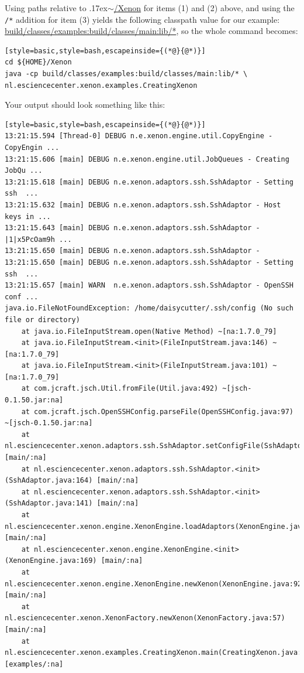\documentclass[12pt, a4paper, twoside,openany,titlepage]{article}
\newcommand{\mytilde}{\raise.17ex\hbox{$\scriptstyle\sim$}}
\begin{document}
{Using paths relative to \mytilde\url{/Xenon} for items (1) and (2) above, and using the \texttt{/*} addition for item (3) yields the following classpath value for our example: \url{build/classes/examples:build/classes/main:lib/*}, so the whole command becomes:
\begin{lstlisting}[style=basic,style=bash,escapeinside={(*@}{@*)}]
cd ${HOME}/Xenon
java -cp build/classes/examples:build/classes/main:lib/* \
nl.esciencecenter.xenon.examples.CreatingXenon
\end{lstlisting} %



Your output should look something like this:
\begin{lstlisting}[style=basic,style=bash,escapeinside={(*@}{@*)}]
13:21:15.594 [Thread-0] DEBUG n.e.xenon.engine.util.CopyEngine - CopyEngin ...
13:21:15.606 [main] DEBUG n.e.xenon.engine.util.JobQueues - Creating JobQu ...
13:21:15.618 [main] DEBUG n.e.xenon.adaptors.ssh.SshAdaptor - Setting ssh  ...
13:21:15.632 [main] DEBUG n.e.xenon.adaptors.ssh.SshAdaptor - Host keys in ...
13:21:15.643 [main] DEBUG n.e.xenon.adaptors.ssh.SshAdaptor - |1|x5PcOam9h ...
13:21:15.650 [main] DEBUG n.e.xenon.adaptors.ssh.SshAdaptor -
13:21:15.650 [main] DEBUG n.e.xenon.adaptors.ssh.SshAdaptor - Setting ssh  ...
13:21:15.657 [main] WARN  n.e.xenon.adaptors.ssh.SshAdaptor - OpenSSH conf ...
java.io.FileNotFoundException: /home/daisycutter/.ssh/config (No such file or directory)
    at java.io.FileInputStream.open(Native Method) ~[na:1.7.0_79]
    at java.io.FileInputStream.<init>(FileInputStream.java:146) ~[na:1.7.0_79]
    at java.io.FileInputStream.<init>(FileInputStream.java:101) ~[na:1.7.0_79]
    at com.jcraft.jsch.Util.fromFile(Util.java:492) ~[jsch-0.1.50.jar:na]
    at com.jcraft.jsch.OpenSSHConfig.parseFile(OpenSSHConfig.java:97) ~[jsch-0.1.50.jar:na]
    at nl.esciencecenter.xenon.adaptors.ssh.SshAdaptor.setConfigFile(SshAdaptor.java:192) [main/:na]
    at nl.esciencecenter.xenon.adaptors.ssh.SshAdaptor.<init>(SshAdaptor.java:164) [main/:na]
    at nl.esciencecenter.xenon.adaptors.ssh.SshAdaptor.<init>(SshAdaptor.java:141) [main/:na]
    at nl.esciencecenter.xenon.engine.XenonEngine.loadAdaptors(XenonEngine.java:182) [main/:na]
    at nl.esciencecenter.xenon.engine.XenonEngine.<init>(XenonEngine.java:169) [main/:na]
    at nl.esciencecenter.xenon.engine.XenonEngine.newXenon(XenonEngine.java:92) [main/:na]
    at nl.esciencecenter.xenon.XenonFactory.newXenon(XenonFactory.java:57) [main/:na]
    at nl.esciencecenter.xenon.examples.CreatingXenon.main(CreatingXenon.java:39) [examples/:na]

\end{lstlisting}}
\end{document}
